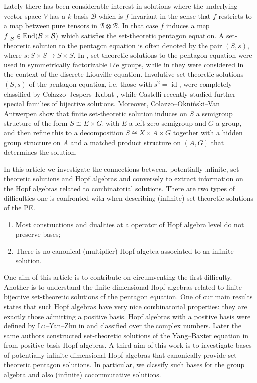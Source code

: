 \documentclass[a4paper,10pt]{amsart}
\theoremstyle{definition}
\theoremstyle{remark}
\newcommand\End{\rm End}
\DeclareMathOperator{\id}{id}
\newcommand\ot{\otimes}
\newcommand\mc{\mathcal}
\newcommand\restr[2]{{%
   \left.\kern-\nulldelimiterspace %
   #1 %
   \right|_{#2} %
   }}
\begin{document}
Lately there has been considerable interest in solutions where the underlying vector space $V$ has a $k$-basis $\mc{B}$ which is $f$-invariant in the sense that $f$ restricts to a map between pure tensors in $\mc{B} \ot \mc{B}$. In that case $f$ induces a map $\restr{f}{\mc{B}} \in \End(\mc{B}\times \mc{B})$ which satisfies the set-theoretic pentagon equation.
A set-theoretic solution to the pentagon equation is often denoted by the pair $(S,s)$, where $s:S\times S\to S\times S$. 
In \cite{zbMATH05238963}, set-theoretic solutions to the pentagon equation were used in symmetrically factorizable Lie groups, while in \cite{zbMATH05984366} they were considered in the context of the discrete Liouville equation.
Involutive set-theoretic solutions $(S,s)$ of the pentagon equation, i.e. those with $s^2=\id$,
were completely classified by Colazzo--Jespers--Kubat \cite{CJK}, while Castelli \cite{castelli} recently studied further special families of bijective solutions. 
Moreover, Colazzo--Okni\'nski--Van Antwerpen  \cite{COvA} show that finite set-theoretic solution induces on $S$ a semigroup structure of the form $S\cong E\times G$,
with $E$ a left-zero semigroup and $G$ a group, and then refine this to a decomposition
$S\cong X\times A\times G$ together with a hidden group structure on $A$ and a matched product
structure on $(A,G)$ that determines the solution.\smallskip

In this article we investigate the connections between, potentially infinite, set-theoretic solutions and Hopf algebras and conversely to extract information on the Hopf algebras related to combinatorial solutions. There are two types of difficulties one is confronted with when describing (infinite) set-theoretic solutions of the PE.
\begin{enumerate}
\item[(i)] Most constructions and dualities at a operator of Hopf algebra level do not preserve bases;
\item[(ii)] There is no canonical (multiplier) Hopf algebra associated to an infinite solution.
\end{enumerate}

One aim of this article is to contribute on circumventing the first difficulty. Another is to understand the finite dimensional Hopf algebras related to finite bijective set-theoretic solutions of the pentagon equation. One of our main results states that such Hopf algebras have very nice combinatorial properties: they are exactly those admitting a positive basis. Hopf algebras with a positive basis were defined by Lu–Yan–Zhu in \cite{zbMATH01616308} and classified over the complex numbers. Later the same authors constructed set-theoretic solutions of the Yang–Baxter equation in \cite{Lu2000} from positive basis Hopf algebras. A third aim of this work is to investigate bases of potentially infinite dimensional Hopf algebras that canonically provide set-theoretic pentagon solutions. In particular, we classify such bases for the group algebra and also (infinite) cocommutative solutions.
\end{document}

